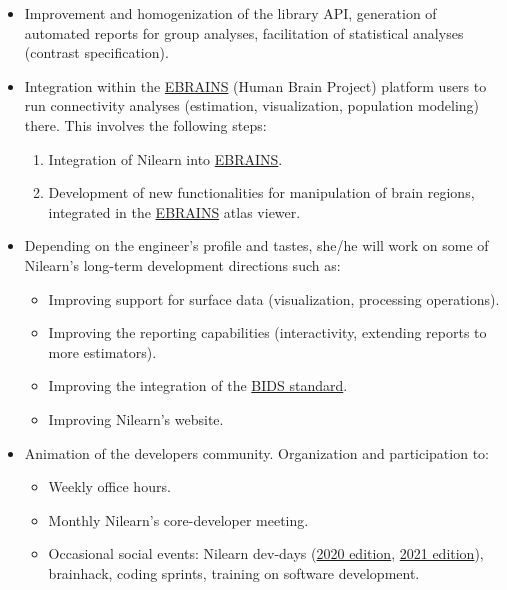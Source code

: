 \documentclass{article}
\begin{document}
\begin{itemize}
	\item Improvement and homogenization of the library API, generation of automated reports for group analyses, facilitation of statistical analyses (contrast specification).
	
	\item Integration within the \href{https://ebrains.eu}{EBRAINS} (Human Brain Project) platform users to run connectivity analyses (estimation, visualization, population modeling) there. This involves the following steps:
	
	\begin{enumerate}
		\item Integration of Nilearn into \href{https://ebrains.eu/}{EBRAINS}.
		\item Development of new functionalities for manipulation of brain regions, integrated in the \href{https://ebrains.eu/}{EBRAINS} atlas viewer.
	\end{enumerate}
  
 	\item Depending on the engineer's profile and tastes, she/he will work on some of Nilearn's long-term development directions such as:
 	
 	\begin{itemize}
 		\item Improving support for surface data (visualization, processing operations).
 		\item Improving the reporting capabilities (interactivity, extending reports to more estimators).
 		\item Improving the integration of the \href{https://bids.neuroimaging.io/}{BIDS standard}.
 		\item Improving Nilearn's website.
 	\end{itemize}
   
   \item Animation of the developers community. Organization and participation to:
   
   \begin{itemize}
   		\item Weekly office hours.
   		\item Monthly Nilearn's core-developer meeting.
   		\item Occasional social events: Nilearn dev-days (\href{https://nilearn.github.io/dev-days-2020/}{2020 edition}, \href{https://nilearn.github.io/dev-days-2021/}{2021 edition}), brainhack, coding sprints, training on software development.
   	\end{itemize}

\end{itemize}
\end{document}
